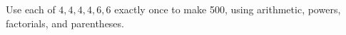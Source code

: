 Use each of $4,4,4,4,6,6$ exactly once to make 500, using arithmetic, powers, factorials, and parentheses.
